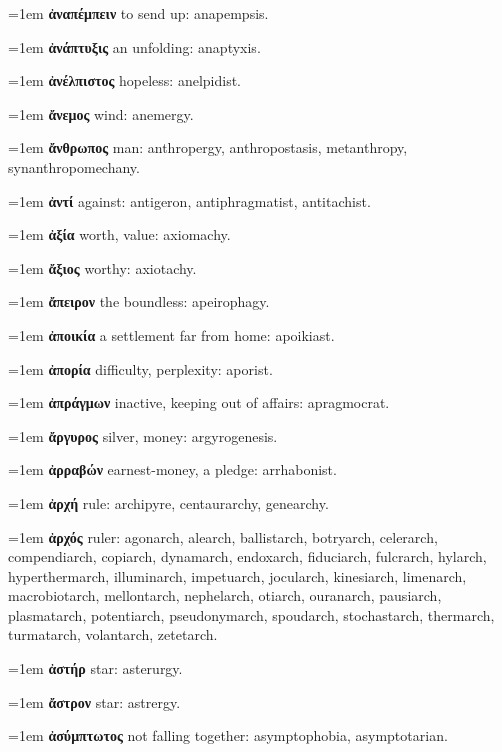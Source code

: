\hangindent=1em \textbf{ἀναπέμπειν} to send up: anapempsis.\par
\hangindent=1em \textbf{ἀνάπτυξις} an unfolding: anaptyxis.\par
\hangindent=1em \textbf{ἀνέλπιστος} hopeless: anelpidist.\par
\hangindent=1em \textbf{ἄνεμος} wind: anemergy.\par
\hangindent=1em \textbf{ἄνθρωπος} man: anthropergy, anthropostasis, metanthropy, synanthropomechany.\par
\hangindent=1em \textbf{ἀντί} against: antigeron, antiphragmatist, antitachist.\par
\hangindent=1em \textbf{ἀξία} worth, value: axiomachy.\par
\hangindent=1em \textbf{ἄξιος} worthy: axiotachy.\par
\hangindent=1em \textbf{ἄπειρον} the boundless: apeirophagy.\par
\hangindent=1em \textbf{ἀποικία} a settlement far from home: apoikiast.\par
\hangindent=1em \textbf{ἀπορία} difficulty, perplexity: aporist.\par
\hangindent=1em \textbf{ἀπράγμων} inactive, keeping out of affairs: apragmocrat.\par
\hangindent=1em \textbf{ἄργυρος} silver, money: argyrogenesis.\par
\hangindent=1em \textbf{ἀρραβών} earnest-money, a pledge: arrhabonist.\par
\hangindent=1em \textbf{ἀρχή} rule: archipyre, centaurarchy, genearchy.\par
\hangindent=1em \textbf{ἀρχός} ruler: agonarch, alearch, ballistarch, botryarch, celerarch, compendiarch, copiarch, dynamarch, endoxarch, fiduciarch, fulcrarch, hylarch, hyperthermarch, illuminarch, impetuarch, jocularch, kinesiarch, limenarch, macrobiotarch, mellontarch, nephelarch, otiarch, ouranarch, pausiarch, plasmatarch, potentiarch, pseudonymarch, spoudarch, stochastarch, thermarch, turmatarch, volantarch, zetetarch.\par
\hangindent=1em \textbf{ἀστήρ} star: asterurgy.\par
\hangindent=1em \textbf{ἄστρον} star: astrergy.\par
\hangindent=1em \textbf{ἀσύμπτωτος} not falling together: asymptophobia, asymptotarian.\par
